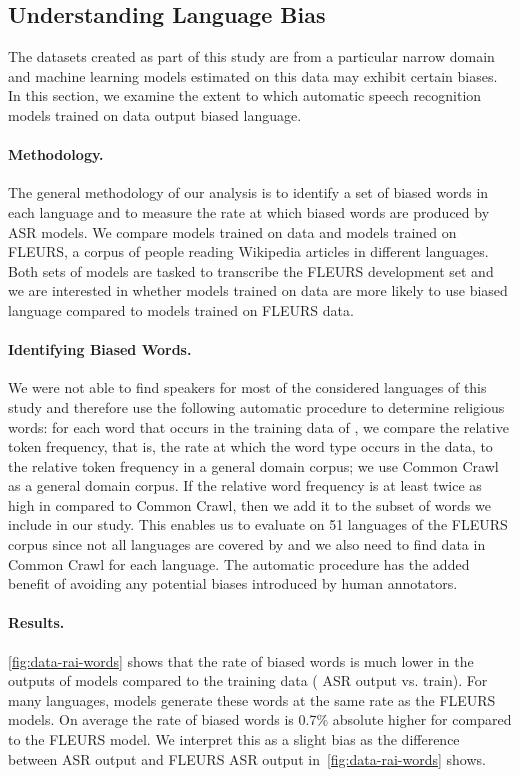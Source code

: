 \subsection{Understanding Language Bias}
\label{sec:rai-lang-bias}

The datasets created as part of this study are from a particular narrow domain and machine learning models estimated on this data may exhibit certain biases.
In this section, we examine the extent to which automatic speech recognition models trained on \MMS{} data output biased language.

\paragraph{Methodology.}
The general methodology of our analysis is to identify a set of biased words in each language and to measure the rate at which biased words are produced by ASR models.
We compare models trained on \MMS{} data and models trained on FLEURS, a corpus of people reading Wikipedia articles in different languages.
Both sets of models are tasked to transcribe the FLEURS development set and we are interested in whether models trained on \MMS{} data are more likely to use biased language compared to models trained on FLEURS data.

\paragraph{Identifying Biased Words.} 
We were not able to find speakers for most of the considered languages of this study and therefore use the following automatic procedure to determine religious words: 
for each word that occurs in the training data of \MMS{}, we compare the relative token frequency, that is, the rate at which the word type occurs in the \MMS{} data, to the relative token frequency in a general domain corpus; we use Common Crawl~\citep{conneau2020xlsr} as a general domain corpus.
If the relative word frequency is at least twice as high in \MMS{} compared to Common Crawl, then we add it to the subset of words we include in our study.
This enables us to evaluate on 51 languages of the FLEURS corpus since not all languages are covered by \MMS{} and we also need to find data in Common Crawl for each language.
The automatic procedure has the added benefit of avoiding any potential biases introduced by human annotators.



\paragraph{Results.}
\autoref{fig:data-rai-words} shows that the rate of biased words is much lower in the outputs of \modelname{} models compared to the training data (\MMS{} ASR output vs. \MMS{} train).
For many languages, \modelname{} models generate these words at the same rate as the FLEURS models.
On average the rate of biased words is 0.7\% absolute higher for \modelname{} compared to the FLEURS model.
We interpret this as a slight bias as the difference between \MMS{} ASR output and FLEURS ASR output in~\autoref{fig:data-rai-words} shows.

